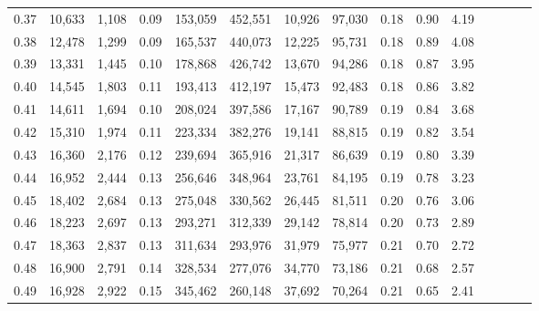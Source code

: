 \begin{tabular}{rrrcrrrrrrrrrrr}
0.37 &  10,633 &  1,108 &                                       0.09 &  153,059 &  452,551 &   10,926 &   97,030 &  0.18 &  0.90 &                         4.19 \\
0.38 &  12,478 &  1,299 &                                       0.09 &  165,537 &  440,073 &   12,225 &   95,731 &  0.18 &  0.89 &                         4.08 \\
0.39 &  13,331 &  1,445 &                                       0.10 &  178,868 &  426,742 &   13,670 &   94,286 &  0.18 &  0.87 &                         3.95 \\
0.40 &  14,545 &  1,803 &                                       0.11 &  193,413 &  412,197 &   15,473 &   92,483 &  0.18 &  0.86 &                         3.82 \\
0.41 &  14,611 &  1,694 &                                       0.10 &  208,024 &  397,586 &   17,167 &   90,789 &  0.19 &  0.84 &                         3.68 \\
0.42 &  15,310 &  1,974 &                                       0.11 &  223,334 &  382,276 &   19,141 &   88,815 &  0.19 &  0.82 &                         3.54 \\
0.43 &  16,360 &  2,176 &                                       0.12 &  239,694 &  365,916 &   21,317 &   86,639 &  0.19 &  0.80 &                         3.39 \\
0.44 &  16,952 &  2,444 &                                       0.13 &  256,646 &  348,964 &   23,761 &   84,195 &  0.19 &  0.78 &                         3.23 \\
0.45 &  18,402 &  2,684 &                                       0.13 &  275,048 &  330,562 &   26,445 &   81,511 &  0.20 &  0.76 &                         3.06 \\
0.46 &  18,223 &  2,697 &                                       0.13 &  293,271 &  312,339 &   29,142 &   78,814 &  0.20 &  0.73 &                         2.89 \\
0.47 &  18,363 &  2,837 &                                       0.13 &  311,634 &  293,976 &   31,979 &   75,977 &  0.21 &  0.70 &                         2.72 \\
0.48 &  16,900 &  2,791 &                                       0.14 &  328,534 &  277,076 &   34,770 &   73,186 &  0.21 &  0.68 &                         2.57 \\
0.49 &  16,928 &  2,922 &                                       0.15 &  345,462 &  260,148 &   37,692 &   70,264 &  0.21 &  0.65 &                         2.41 \\

\end{tabular}
